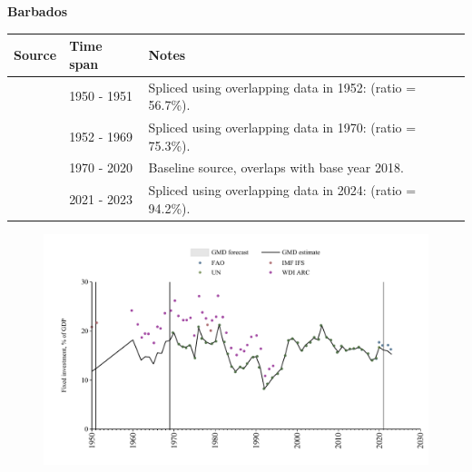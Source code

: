 \documentclass[12pt,a4paper,landscape]{article}
\begin{document}
\begin{adjustbox}{max totalsize={\paperwidth}{\paperheight},center}
\begin{minipage}[t][\textheight][t]{\textwidth}
\vspace*{0.5cm}
{}
\begin{center}
{\Large\bfseries Barbados}
\end{center}
\vspace{0.5cm}
\begin{table}[H]
\centering
\small
\begin{tabular}{|l|l|l|}
\hline
\textbf{Source} & \textbf{Time span} & \textbf{Notes} \\
\hline
\rowcolor{white}\cite{IMF_IFS}& 1950 - 1951 &Spliced using overlapping data in 1952: (ratio = 56.7\%).\\
\rowcolor{lightgray}\cite{WDI_ARC}& 1952 - 1969 &Spliced using overlapping data in 1970: (ratio = 75.3\%).\\
\rowcolor{white}\cite{UN}& 1970 - 2020 &Baseline source, overlaps with base year 2018.\\
\rowcolor{lightgray}\cite{FAO}& 2021 - 2023 &Spliced using overlapping data in 2024: (ratio = 94.2\%).\\
\hline
\end{tabular}
\end{table}
\begin{figure}[H]
\centering
\includegraphics[width=\textwidth,height=0.6\textheight,keepaspectratio]{graphs/BRB_finv_GDP.pdf}
\end{figure}
\end{minipage}
\end{adjustbox}
\end{document}
